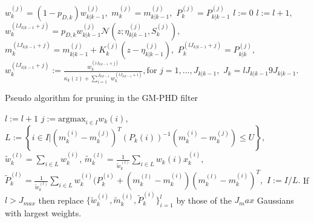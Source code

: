 \begin{algorithm}
\begin{algorithmic}[1]
        \State
         
            \State $w_k^{(j)} = (1 - p_{D,k}) w_{k|k-1}^{(j)},$ \quad
             $m_k^{(j)} = m_{k|k-1}^{(j)},$ \quad
             $P_k^{(j)} = P_{k|k-1}^{(j)}$
        \EndFor
        \State $l:=0$
         
            \State $l:=l+1,$
                \State $w_k^{(l J_{k|k-1} + j)} = p_{D,k} w_{k|k-1}^{(j)} \mathcal{N}(z; \eta_{k|k-1}^{(j)},S_k^{(j)}),$
                \State $m_k^{(l J_{k|k-1} + j)} = m_{k|k-1}^{(j)} + K_k^{(j)} (z - \eta_{k|k-1}^{(j)}),$
                \State $P_k^{(l J_{k|k-1} + j)} = P_{k|k}^{(j)},$
            \EndFor
        \State $w_k^{(l J_{k|k-1} + j)} := \frac{w_k^{(l J_{k|k-1} + j)}}{\kappa_k(z) + \sum_{i=1}^{J_{k|k-1}} w_k^{(
            l J_{k|k-1} + i)}}, \text{for $j = 1,\dots,J_{k|k-1}$},$
        \EndFor
        \State $J_k = l J_{k|k-1} 9 J_{k|k-1}.$
        \EndProcedure

    \end{algorithmic}
\end{algorithm}


\begin{algorithm}
    \caption{Pseudo algorithm for pruning in the GM-PHD filter}
    \begin{algorithmic}[1]
            \State $l:= l+1$
            \State $j:= \text{argmax}_{i \in I} w_k{(i)},$
            \State $L:= \left\{ i \in I | (m_k^{(i)} - m_k^{(j)})^T (P_k{(i)})^{-1} (m_k^{(i)} - m_k^{(j)}) \leq U \right\},$
            \State $\tilde{w}_k^{(l)} = \sum_{i \in L} w_k^{(i)}$,
            \State $\tilde{m}_k^{(l)} = \frac{1}{\tilde{w}_k^{(l)}} \sum_{i \in L} w_k{(i)} x_k^{(i)},$
            \State $\tilde{P}_k^{(l)} = \frac{1}{\tilde{w}_k^{(l)}} \sum_{i \in L} w_k^{(i)} (P_k^{(i)} + (m_k^{(l)} - m _k^{(i)}) (m_k^{(l)} - m _k^{(i)})^T,$
            \State $I:= I/L.$
        \EndWhile
        \EndProcedure
        \State
        \State If $l > J_{max}$ then replace $\{ \tilde{w}_k^{(i)}, \tilde{m}_k^{(i)}, \tilde{P}_k^{(i)} \}_{i=1}^l$
        by those of the $J_max$ Gaussians with largest weights.
        \State

    \end{algorithmic}
\end{algorithm}




